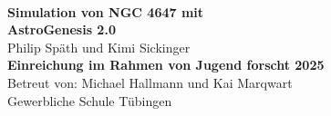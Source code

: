 \thispagestyle{empty}

\begin{center}
    {\huge \textbf{}} \\[8cm]
    {\huge \textbf{Simulation von NGC 4647 mit}} \\[0.5cm]
    {\huge \textbf{AstroGenesis 2.0}} \\[0.5cm]
    {\large Philip Späth und Kimi Sickinger} \\[9cm]
    {\large \textbf{Einreichung im Rahmen von Jugend forscht 2025}} \\[0.5cm]
    {\large Betreut von: Michael Hallmann und Kai Marqwart} \\[0.5cm]
    {\large Gewerbliche Schule Tübingen} \\[0.5cm]
\end{center}